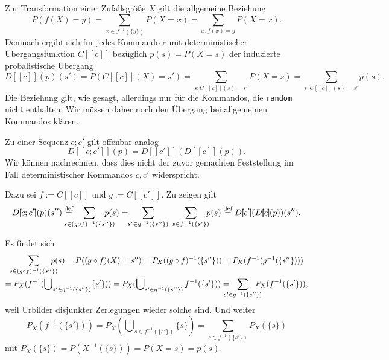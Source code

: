 \documentclass[8pt,fleqn,aspectratio=169]{beamer}
\newcommand{\parspace}{\vspace{0.8em}}
\newcommand{\code}[1]{{\texttt{#1}}}
\newcommand{\qb}[1]{[\!\![#1]\!\!]}
\begin{document}
\begin{frame}
Zur Transformation einer Zufallsgröße $X$ gilt die allgemeine Beziehung
\[P(f(X)=y) = \sum_{x\in f^{-1}(\{y\})} P(X=x) = \sum_{x\colon f(x)=y} P(X=x).\]\pause
Demnach ergibt sich für jedes Kommando $c$ mit deterministischer Übergangsfunktion
$C\qb{c}$ bezüglich $p(s)=P(X=s)$ der induzierte probalistische Übergang
\[D\qb{c}(p)(s') = P(C\qb{c}(X)=s') = \sum_{s\colon C\qb{c}(s)=s'} P(X=s)
= \sum_{s\colon C\qb{c}(s)=s'} p(s).\]\pause
Die Beziehung gilt, wie gesagt, allerdings nur für die Kommandos,
die \code{random} nicht enthalten. Wir müssen daher noch den
Übergang bei allgemeinen Kommandos klären.
\end{frame}

\begin{frame}
Zu einer Sequenz $c;c'$ gilt offenbar analog
\[D\qb{c;c'}(p) = D\qb{c'}(D\qb{c}(p)).\]\pause
Wir können nachrechnen, dass dies nicht der zuvor gemachten
Feststellung im Fall deterministischer Kommandos $c,c'$ widerspricht.

\parspace
Dazu sei $f := C\qb{c}$ und $g := C\qb{c'}$. Zu zeigen gilt
\[D\qb{c;c'}(p)(s'') \stackrel{\text{def}}=
\hspace{-1.4em}\sum_{s\in (g\circ f)^{-1}(\{s''\})}\hspace{-1.4em} p(s) = 
\!\!\sum_{s'\in g^{-1}(\{s''\})}\;\sum_{s\in f^{-1}(\{s'\})}\hspace{-0.5em} p(s)
\stackrel{\text{def}}= D\qb{c'}(D\qb{c}(p))(s'').\]
\end{frame}

\begin{frame}
Es findet sich
\begin{gather*}
\sum_{s\in (g\circ f)^{-1}(\{s''\})}\hspace{-1em} p(s) = P((g\circ f)(X)=s'')
= P_X((g\circ f)^{-1}(\{s''\})) = P_X(f^{-1}(g^{-1}(\{s''\})))\\
= P_X(f^{-1}(\bigcup\nolimits_{s'\in g^{-1}(\{s''\})}\{s'\}))
= P_X(\bigcup\nolimits_{s'\in g^{-1}(\{s''\})}f^{-1}(\{s'\}))
= \hspace{-1em}\sum_{s'\in g^{-1}(\{s''\})}\hspace{-1em} P_X(f^{-1}(\{s'\})),
\end{gather*}
weil Urbilder disjunkter Zerlegungen wieder solche sind. Und weiter
\[P_X(f^{-1}(\{s'\})) = P_X(\bigcup\nolimits_{s\in f^{-1}(\{s'\})}\{s\})
= \sum_{s\in f^{-1}(\{s'\})} P_X(\{s\})\]
mit $P_X(\{s\}) = P(X^{-1}(\{s\})) = P(X=s) = p(s)$.
\end{frame}
\end{document}

